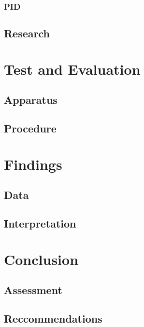 \documentclass[paper=a4, fontsize=11pt]{scrartcl} %
\numberwithin{equation}{section} %
\numberwithin{figure}{section} %
\begin{document}
\subsubsection{PID}
\subsection{Research}
\section{Test and Evaluation}
\subsection{Apparatus}
\subsection{Procedure}
\section{Findings}
\subsection{Data}
\subsection{Interpretation}
\section{Conclusion}
\subsection{Assessment}
\subsection{Reccommendations}

\printbibliography
\end{document}
